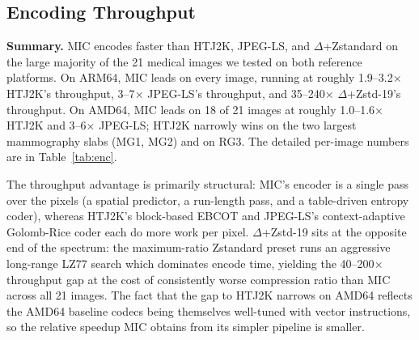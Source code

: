 \documentclass[journal]{IEEEtran}
\begin{document}
\subsection{Encoding Throughput}

\textbf{Summary.} MIC encodes faster than HTJ2K, JPEG-LS, and
$\Delta$+Zstandard on the large majority of the 21 medical images we
tested on both reference platforms. On ARM64, MIC leads on every image,
running at roughly 1.9--3.2$\times$ HTJ2K's throughput, 3--7$\times$
JPEG-LS's throughput, and 35--240$\times$ $\Delta$+Zstd-19's throughput.
On AMD64, MIC leads on 18 of 21 images at roughly 1.0--1.6$\times$
HTJ2K and 3--6$\times$ JPEG-LS; HTJ2K narrowly wins on the two largest
mammography slabs (MG1, MG2) and on RG3. The detailed per-image numbers
are in Table~\ref{tab:enc}.

The throughput advantage is primarily structural: MIC's encoder is a
single pass over the pixels (a spatial predictor, a run-length pass, and
a table-driven entropy coder), whereas HTJ2K's block-based EBCOT and
JPEG-LS's context-adaptive Golomb-Rice coder each do more work per pixel.
$\Delta$+Zstd-19 sits at the opposite end of the spectrum: the
maximum-ratio Zstandard preset runs an aggressive long-range LZ77 search
which dominates encode time, yielding the 40--200$\times$ throughput gap
at the cost of consistently worse compression ratio than MIC across all
21 images. The fact that the gap to HTJ2K narrows on AMD64 reflects the
AMD64 baseline codecs being themselves well-tuned with vector
instructions, so the relative speedup MIC obtains from its simpler
pipeline is smaller.
\end{document}
